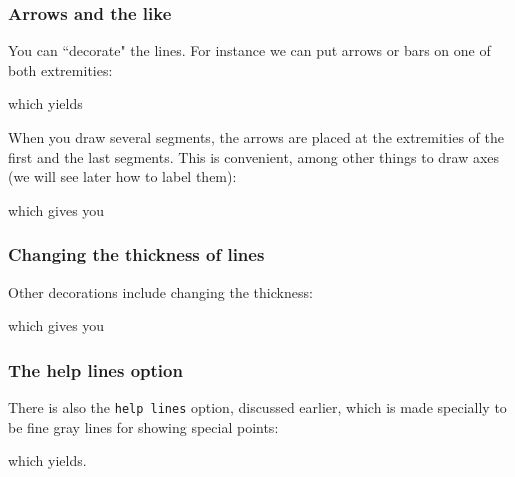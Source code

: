 %
%
\begin{frame}[fragile]
  \frametitle{
    Arrows and the like
  }

  You can ``decorate" the lines. For instance we can put arrows or bars on one of both extremities:

  
  
  which yields

  \begin{center}
    
  \end{center}
  
\end{frame}
%
%
\begin{frame}[fragile]

  When you draw several segments, the arrows are placed at the extremities of the first and the last segments. This is convenient, among other things to draw axes (we will see later how to label them):

  
  
which gives you

  \begin{center}
    
  \end{center}
  
\end{frame}
%
%
\begin{frame}[fragile]
  \frametitle{
    Changing the thickness of lines
  }

  Other decorations include changing the thickness:

  
  
  which gives you

  \begin{center}
    
  \end{center}
  
\end{frame}
%
%
\begin{frame}[fragile]
  \frametitle{
    The help lines option
  }

  There is also the {\tt help lines} option, discussed earlier, which is made specially to be fine gray lines for showing special points:

    
  
  which yields.

  \begin{center}
    
  \end{center}
  
\end{frame}
